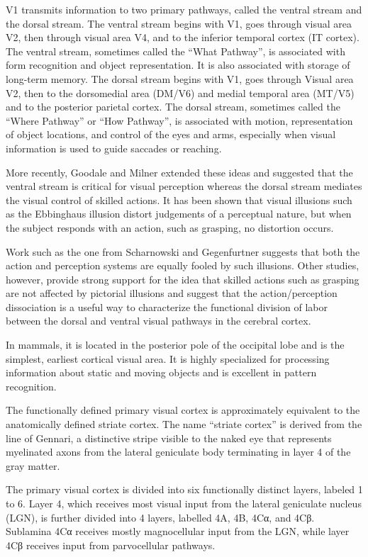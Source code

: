 V1 transmits information to two primary pathways, called the ventral stream and the dorsal stream. The ventral stream begins with V1, goes through visual area V2, then through visual area V4, and to the inferior temporal cortex (IT cortex). The ventral stream, sometimes called the ``What Pathway'', is associated with form recognition and object representation. It is also associated with storage of long-term memory.
The dorsal stream begins with V1, goes through Visual area V2, then to the dorsomedial area (DM/V6) and medial temporal area (MT/V5) and to the posterior parietal cortex. The dorsal stream, sometimes called the ``Where Pathway'' or ``How Pathway'', is associated with motion, representation of object locations, and control of the eyes and arms, especially when visual information is used to guide saccades or reaching.

More recently, Goodale and Milner extended these ideas and suggested that the ventral stream is critical for visual perception whereas the dorsal stream mediates the visual control of skilled actions. It has been shown that visual illusions such as the Ebbinghaus illusion distort judgements of a perceptual nature, but when the subject responds with an action, such as grasping, no distortion occurs.

Work such as the one from Scharnowski and Gegenfurtner suggests that both the action and perception systems are equally fooled by such illusions. Other studies, however, provide strong support for the idea that skilled actions such as grasping are not affected by pictorial illusions and suggest that the action/perception dissociation is a useful way to characterize the functional division of labor between the dorsal and ventral visual pathways in the cerebral cortex.

In mammals, it is located in the posterior pole of the occipital lobe and is the simplest, earliest cortical visual area. It is highly specialized for processing information about static and moving objects and is excellent in pattern recognition.

The functionally defined primary visual cortex is approximately equivalent to the anatomically defined striate cortex. The name ``striate cortex'' is derived from the line of Gennari, a distinctive stripe visible to the naked eye that represents myelinated axons from the lateral geniculate body terminating in layer 4 of the gray matter.

The primary visual cortex is divided into six functionally distinct layers, labeled 1 to 6. Layer 4, which receives most visual input from the lateral geniculate nucleus (LGN), is further divided into 4 layers, labelled 4A, 4B, 4Cα, and 4Cβ. Sublamina 4Cα receives mostly magnocellular input from the LGN, while layer 4Cβ receives input from parvocellular pathways.

